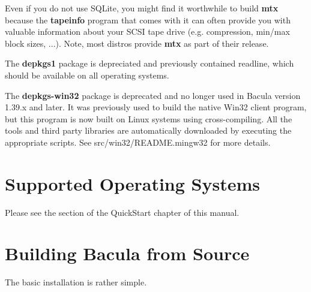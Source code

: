 Even if you do not use SQLite, you might find it worthwhile to build {\bf mtx}
because the {\bf tapeinfo} program that comes with it can often provide you
with valuable information about your SCSI tape drive (e.g. compression,
min/max block sizes, ...). Note, most distros provide {\bf mtx} as part of 
their release.

The {\bf depkgs1} package is depreciated and previously contained
readline, which should be available on all operating systems.

The {\bf depkgs-win32} package is deprecated and no longer used in 
Bacula version 1.39.x and later. It was previously used to build
the native Win32 client program, but this program is now built on Linux
systems using cross-compiling.  All the tools and third party libraries
are automatically downloaded by executing the appropriate scripts.  See
src/win32/README.mingw32 for more details.

\section{Supported Operating Systems}
\label{Systems}

Please see the 
 section
of the QuickStart chapter of this manual. 

\section{Building Bacula from Source}
\label{Building}

The basic installation is rather simple. 

